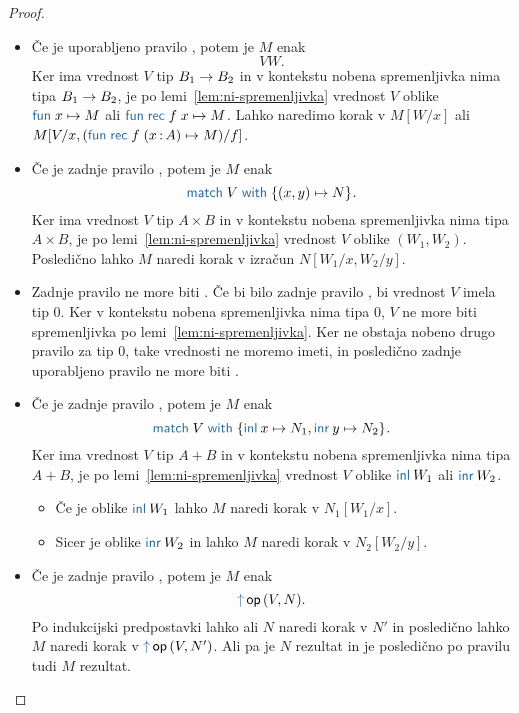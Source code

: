 \begin{proof}
\begin{itemize}
\begin{itemize}
		\end{itemize}
	
		\item Če je uporabljeno pravilo , potem je $M$ enak $$V W.$$
		Ker ima vrednost $V$ tip $B_1 \to B_2$ in v kontekstu nobena spremenljivka nima tipa $B_1 \to B_2$, je po lemi~\ref{lem:ni-spremenljivka} vrednost $V$ oblike $\tmfunano{x}{M}$ ali $\tmfunrecano{f}{x}{M}$.
		Lahko naredimo korak v $M[W/x]$ ali $M[V/x, (\tmfunrec{f}{x \of A}{M})/f]$.
		
		\item Če je zadnje pravilo , potem je $M$ enak $$\tmmatch{V}{(x,y) \mapsto N}.$$
		Ker ima vrednost $V$ tip $A \times B$ in v kontekstu nobena spremenljivka nima tipa $A \times B$, je po lemi~\ref{lem:ni-spremenljivka} vrednost $V$ oblike $(W_1,W_2)$.
		Posledično lahko $M$ naredi korak v izračun $N[W_1/x,W_2/y]$.
		
		\item Zadnje pravilo ne more biti .
		Če bi bilo zadnje pravilo , bi vrednost $V$ imela tip $0$. 
		Ker v kontekstu nobena spremenljivka nima tipa $0$, $V$ ne more biti spremenljivka po lemi~\ref{lem:ni-spremenljivka}.
		Ker ne obstaja nobeno drugo pravilo za tip $0$, take vrednosti ne moremo imeti, in posledično zadnje uporabljeno pravilo ne more biti .

		
		\item Če je zadnje pravilo , potem je $M$ enak $$\tmmatch{V}{\tminl{x} \mapsto N_1, \tminr{y} \mapsto N_2}.$$
		Ker ima vrednost $V$ tip $A + B$ in v kontekstu nobena spremenljivka nima tipa $A + B$, je po lemi~\ref{lem:ni-spremenljivka} vrednost $V$ oblike $\tminl{W_1}$ ali $\tminr{W_2}$.
		\begin{itemize}
			\item Če je oblike $\tminl{W_1}$ lahko $M$ naredi korak v $N_1[W_1/x]$.
			\item Sicer je oblike $\tminr{W_2}$ in lahko $M$ naredi korak v $N_2[W_2/y]$.
		\end{itemize}
		
		\item Če je zadnje pravilo , potem je $M$ enak $$\tmopout{op}{V}{N}.$$
		Po indukcijski predpostavki lahko ali $N$ naredi korak v $N'$ in posledično lahko $M$ naredi korak v $\tmopout{op}{V}{N'}$.
		Ali pa je $N$ rezultat in je posledično po pravilu  tudi $M$ rezultat.
		

\end{itemize}
\end{proof}
